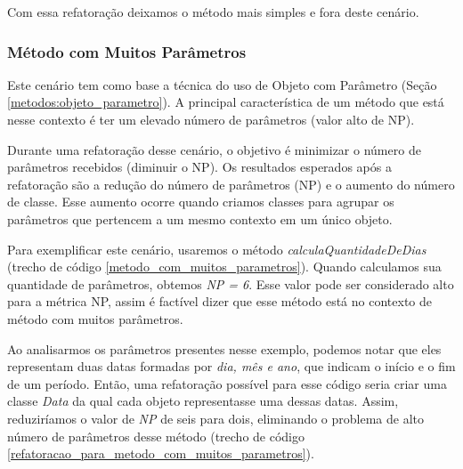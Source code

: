 Com essa refatoração deixamos o método mais simples e fora deste cenário.


\subsubsection{Método com Muitos Parâmetros}
                                                                         
Este cenário tem como base a técnica do uso de Objeto com Parâmetro (Seção \ref{metodos:objeto_parametro}). A principal característica de um método que está nesse contexto é ter um elevado número de parâmetros (valor alto de NP).
                                                         
Durante uma refatoração desse cenário, o objetivo é minimizar o número de parâmetros recebidos (diminuir o NP). Os resultados esperados após a refatoração são a redução do número de parâmetros (NP) e o aumento do número de classe. Esse aumento ocorre quando criamos classes para agrupar os parâmetros que pertencem a um mesmo contexto em um único objeto.
	                                               
Para exemplificar este cenário, usaremos o método \textit{calculaQuantidadeDeDias} (trecho de código \ref{metodo_com_muitos_parametros}). Quando calculamos sua quantidade de parâmetros, obtemos \textit{NP = 6}. Esse valor pode ser considerado alto para a métrica NP, assim é factível dizer que esse método está no contexto de método com muitos parâmetros.                    	

                   
                                                                                                        
Ao analisarmos os parâmetros presentes nesse exemplo, podemos notar que eles representam duas datas formadas por \textit{dia, mês e ano}, que indicam o início e o fim de um período. Então, uma refatoração possível para esse código seria criar uma classe \textit{Data} da qual cada objeto representasse uma dessas datas. Assim, reduziríamos o valor de \textit{NP} de seis para dois, eliminando o problema de alto número de parâmetros desse método (trecho de código \ref{refatoracao_para_metodo_com_muitos_parametros}). 
                                                                               
